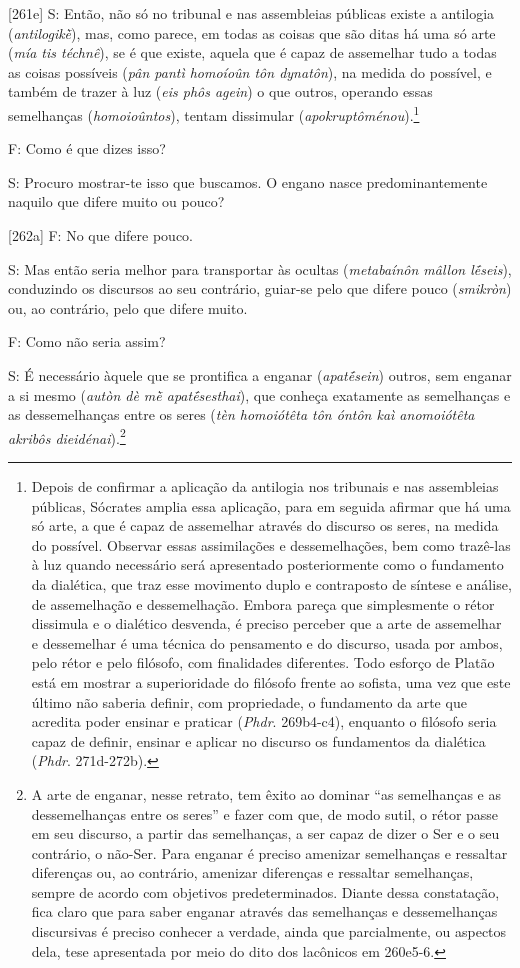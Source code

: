 {[}261e{]} S: Então, não só no tribunal e nas assembleias públicas
existe a antilogia (\emph{antilogikḕ}), mas, como parece, em todas as
coisas que são ditas há uma só arte (\emph{mía tis téchnê}), se é que
existe, aquela que é capaz de assemelhar tudo a todas as coisas
possíveis (\emph{pân pantì homoíoûn tôn dynatôn}), na medida do
possível, e também de trazer à luz (\emph{eis phôs agein}) o que outros,
operando essas semelhanças (\emph{homoioûntos}), tentam dissimular
(\emph{apokruptôménou}).\footnote{Depois de confirmar a aplicação da
  antilogia nos tribunais e nas assembleias públicas, Sócrates amplia
  essa aplicação, para em seguida afirmar que há uma só arte, a que é
  capaz de assemelhar através do discurso os seres, na medida do
  possível. Observar essas assimilações e dessemelhações, bem como
  trazê-las à luz quando necessário será apresentado posteriormente como
  o fundamento da dialética, que traz esse movimento duplo e contraposto
  de síntese e análise, de assemelhação e dessemelhação. Embora pareça
  que simplesmente o rétor dissimula e o dialético desvenda, é preciso
  perceber que a arte de assemelhar e dessemelhar é uma técnica do
  pensamento e do discurso, usada por ambos, pelo rétor e pelo filósofo,
  com finalidades diferentes. Todo esforço de Platão está em mostrar a
  superioridade do filósofo frente ao sofista, uma vez que este último
  não saberia definir, com propriedade, o fundamento da arte que
  acredita poder ensinar e praticar (\emph{Phdr}. 269b4-c4), enquanto o
  filósofo seria capaz de definir, ensinar e aplicar no discurso os
  fundamentos da dialética (\emph{Phdr}. 271d-272b).}

F: Como é que dizes isso?

S: Procuro mostrar-te isso que buscamos. O engano nasce
predominantemente naquilo que difere muito ou pouco?

{[}262a{]} F: No que difere pouco.

S: Mas então seria melhor para transportar às ocultas (\emph{metabaínôn
mâllon lḗseis}), conduzindo os discursos ao seu contrário, guiar-se pelo
que difere pouco (\emph{smikròn}) ou, ao contrário, pelo que difere
muito.

F: Como não seria assim?

S: É necessário àquele que se prontifica a enganar (\emph{apatḗsein})
outros, sem enganar a si mesmo (\emph{autòn dè mḕ apatḗsesthai}), que
conheça exatamente as semelhanças e as dessemelhanças entre os seres
(\emph{tèn homoiótêta tôn óntôn kaì anomoiótêta akribôs
dieidénai}).\footnote{A arte de enganar, nesse retrato, tem êxito ao
  dominar ``as semelhanças e as dessemelhanças entre os seres'' e fazer
  com que, de modo sutil, o rétor passe em seu discurso, a partir das
  semelhanças, a ser capaz de dizer o Ser e o seu contrário, o não-Ser.
  Para enganar é preciso amenizar semelhanças e ressaltar diferenças ou,
  ao contrário, amenizar diferenças e ressaltar semelhanças, sempre de
  acordo com objetivos predeterminados. Diante dessa constatação, fica
  claro que para saber enganar através das semelhanças e dessemelhanças
  discursivas é preciso conhecer a verdade, ainda que parcialmente, ou
  aspectos dela, tese apresentada por meio do dito dos lacônicos em
  260e5-6.}

